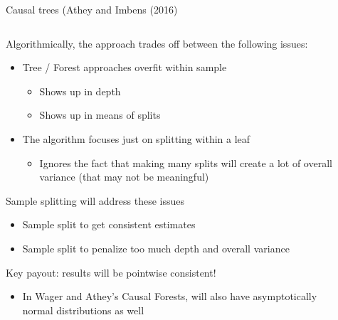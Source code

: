 \documentclass[notes,11pt, aspectratio=169]{beamer}
\newenvironment{wideitemize}{\itemize\addtolength{\itemsep}{10pt}}{\enditemize}
\begin{document}
\begin{frame}{Causal trees (Athey and Imbens (2016)}
    \begin{columns}[onlytextwidth, T] %
      \begin{column}{.7\textwidth}
        \begin{wideitemize}
        \item Algorithmically, the approach trades off between the following issues:
          \begin{itemize}
          \item Tree / Forest approaches overfit within sample
            \begin{itemize}
            \item Shows up in depth
            \item Shows up in means of splits
            \end{itemize}
          \item The algorithm focuses just on splitting within a leaf
            \begin{itemize}
            \item Ignores the fact that making many splits will create
              a lot of overall variance (that may not be meaningful)
            \end{itemize}
          \end{itemize}
        \item Sample splitting will address these issues
          \begin{itemize}
          \item Sample split to get consistent estimates
          \item Sample split to penalize too much depth and overall variance
          \end{itemize}
        \item Key payout: results will be pointwise consistent!
          \begin{itemize}
          \item In Wager and Athey's Causal Forests, will also have
            asymptotically normal distributions as well
          \end{itemize}
        \end{wideitemize}
      \end{column}%
      \hfill%
      \begin{column}{.5\textwidth}
      \end{column}%
    \end{columns}
\end{frame}
\end{document}
